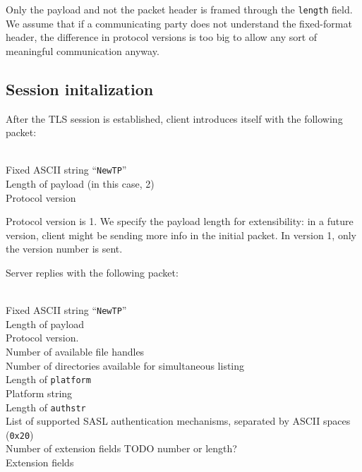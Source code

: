 Only the payload and not the packet header is framed through the {\tt length} field. We assume that if
a communicating party does not understand the fixed-format header, the difference in protocol versions is too
big to allow any sort of meaningful communication anyway.

%

\subsection{Session initalization}

\begin{samepage}
After the TLS session is established, client introduces itself with the following packet:
\begin{description}[parsep=1pt]
	 \hfill \\
		Fixed ASCII string ``{\tt NewTP}''
	 \hfill \\
		Length of payload (in this case, 2)
	 \hfill \\
		Protocol version
\end{description}

Protocol version is 1. We specify the payload length for extensibility: in a future version, client might be
sending more info in the initial packet. In version 1, only the version number is sent.
\end{samepage}

\begin{samepage}
Server replies with the following packet:
\begin{description}[parsep=1pt]
	 \hfill \\
		Fixed ASCII string ``{\tt NewTP}''
	 \hfill \\
		Length of payload
	 \hfill \\
		Protocol version.
	 \hfill \\
		Number of available file handles
	 \hfill \\
		Number of directories available for simultaneous listing
	 \hfill \\
		Length of {\tt platform}
	 \hfill \\
		Platform string
	 \hfill \\
		Length of {\tt authstr}
	 \hfill \\
		List of supported SASL authentication mechanisms, separated by ASCII spaces ({\tt 0x20})
	 \hfill \\
		Number of extension fields TODO number or length?
	 \hfill \\
		Extension fields
\end{description}
\end{samepage}


